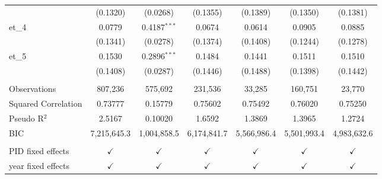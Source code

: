 \begin{tabular}{lcccccc}
                       & (0.1320)      & (0.0268)         & (0.1355)          & (0.1389)          & (0.1350)                        & (0.1381)\\   
   et\_4               & 0.0779        & 0.4187$^{***}$   & 0.0674            & 0.0614            & 0.0905                          & 0.0885\\   
                       & (0.1341)      & (0.0278)         & (0.1374)          & (0.1408)          & (0.1244)                        & (0.1278)\\   
   et\_5               & 0.1530        & 0.2896$^{***}$   & 0.1484            & 0.1441            & 0.1511                          & 0.1510\\   
                       & (0.1408)      & (0.0287)         & (0.1446)          & (0.1488)          & (0.1398)                        & (0.1442)\\   
    \\
   Observations        & 807,236       & 575,692          & 231,536           & 33,285            & 160,751                         & 23,770\\  
   Squared Correlation & 0.73777       & 0.15779          & 0.75602           & 0.75492           & 0.76020                         & 0.75250\\  
   Pseudo R$^2$        & 2.5167        & 0.10020          & 1.6592            & 1.3869            & 1.3965                          & 1.2724\\  
   BIC                 & 7,215,645.3   & 1,004,858.5      & 6,174,841.7       & 5,566,986.4       & 5,501,993.4                     & 4,983,632.6\\  
    \\
   PID fixed effects   & $\checkmark$  & $\checkmark$     & $\checkmark$      & $\checkmark$      & $\checkmark$                    & $\checkmark$\\   
   year fixed effects  & $\checkmark$  & $\checkmark$     & $\checkmark$      & $\checkmark$      & $\checkmark$                    & $\checkmark$\\   
   \bottomrule
\end{tabular}
\par\endgroup



